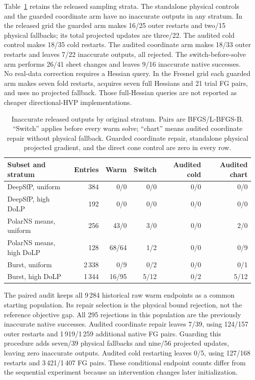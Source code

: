 Table~\ref{SI-tab:chartstrata} retains the released sampling strata. The standalone physical controls and the guarded coordinate arm have no inaccurate outputs in any stratum. In the released grid the guarded arm makes 16/25 outer restarts and two/15 physical fallbacks; its total projected updates are three/22. The audited cold control makes 18/35 cold restarts. The audited coordinate arm makes 18/33 outer restarts and leaves 7/22 inaccurate outputs, all rejected. The switch-before-solve arm performs 26/41 sheet changes and leaves 9/16 inaccurate native successes. No real-data correction requires a Hessian query. In the Fresnel grid each guarded arm makes seven fold restarts, acquires seven full Hessians and 21 trial FG pairs, and uses no projected fallback. Those full-Hessian queries are not reported as cheaper directional-HVP implementations.

\begin{table}[!t]
\caption{Inaccurate released outputs by original stratum. Pairs are BFGS/L-BFGS-B. ``Switch'' applies before every warm solve; ``chart'' means audited coordinate repair without physical fallback. Guarded coordinate repair, standalone physical projected gradient, and the direct cone control are zero in every row.}
\label{SI-tab:chartstrata}
\centering\small\renewcommand{\arraystretch}{1.12}
\begin{tabularx}{\textwidth}{@{}Xrrrrr@{}}\toprule
Subset and stratum & Entries & Warm & Switch & Audited cold & Audited chart\\\midrule
DeepSfP, uniform & 384 & 0/0 & 0/0 & 0/0 & 0/0\\
DeepSfP, high DoLP & 192 & 0/0 & 0/0 & 0/0 & 0/0\\
PolarNS means, uniform & 256 & 43/0 & 3/0 & 0/0 & 2/0\\
PolarNS means, high DoLP & 128 & 68/64 & 1/2 & 0/0 & 0/9\\
Burst, uniform & 2\,338 & 0/9 & 0/2 & 0/0 & 0/1\\
Burst, high DoLP & 1\,344 & 16/95 & 5/12 & 0/2 & 5/12\\
\bottomrule\end{tabularx}
\end{table}

The paired audit keeps all 9\,284 historical raw warm endpoints as a common starting population. Its repair selection is the physical bound rejection, not the reference objective gap. All 295 rejections in this population are the previously inaccurate native successes. Audited coordinate repair leaves 7/39, using 124/157 outer restarts and 1\,919/1\,259 additional native FG pairs. Guarding this procedure adds seven/39 physical fallbacks and nine/56 projected updates, leaving zero inaccurate outputs. Audited cold restarting leaves 0/5, using 127/168 restarts and 3\,421/1\,407 FG pairs. These conditional endpoint counts differ from the sequential experiment because an intervention changes later initialization.

